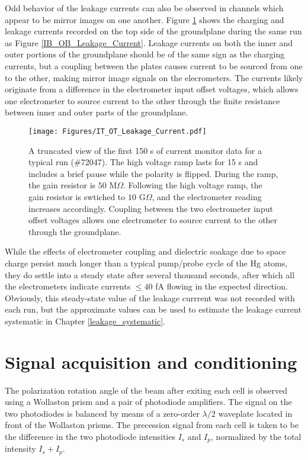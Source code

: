 \documentclass [10pt, twoside] {uwthesis}[2012/04/02]
\begin{document}
Odd behavior of the leakage currents can also be observed in channels which appear to be mirror images on one another. Figure \ref{IT_OT_Leakage_Current} shows the charging and leakage currents recorded on the top side of the groundplane during the same run as Figure \ref{IB_OB_Leakage_Current}. Leakage currents on both the inner and outer portions of the groundplane should be of the same sign as the charging currents, but a coupling between the plates causes current to be sourced from one to the other, making mirror image signals on the elecrometers. The currents likely originate from a difference in the electrometer input offset voltages, which allows one electrometer to source current to the other through the finite resistance between inner and outer parts of the groundplane.

\begin{figure}
\begin{center}
\texttt{[image: Figures/IT\_OT\_Leakage\_Current.pdf]}
\end{center}
\caption[Top Side Leakage Currents]
{\narrower A truncated view of the first 150 s of current monitor data for a typical run (\#72047). The high voltage ramp lasts for 15 s and includes a brief pause while the polarity is flipped. During the ramp, the gain resistor is $50\text{ M}\Omega$. Following the high voltage ramp, the gain resistor is swtiched to $10\text{ G}\Omega$, and the electrometer reading increases accordingly. Coupling between the two electrometer input offset voltages allows one electrometer to source current to the other through the groundplane. }
\label{IT_OT_Leakage_Current}
\end{figure}	

While the effects of electrometer coupling and dielectric soakage due to space charge persist much longer than a typical pump/probe cycle of the Hg atoms, they do settle into a steady state after several thousand seconds, after which all the electrometers indicate currents $\le 40$ fA flowing in the expected direction. Obviously, this steady-state value of the leakage currrent was not recorded with each run, but the approximate values can be used to estimate the leakage current systematic in Chapter \ref{leakage_systematic}.

\section{Signal acquisition and conditioning}
The polarization rotation angle of the beam after exiting each cell is observed using a Wollaston prism and a pair of photodiode amplifiers. The signal on the two photodiodes is balanced by means of a zero-order $\lambda/2$ waveplate located in front of the Wollaston prisms. The precession signal from each cell is taken to be the difference in the two photodiode intensities $I_s$ and $I_p$, normalized by the total intensity $I_s+I_p$. 
\end{document}

